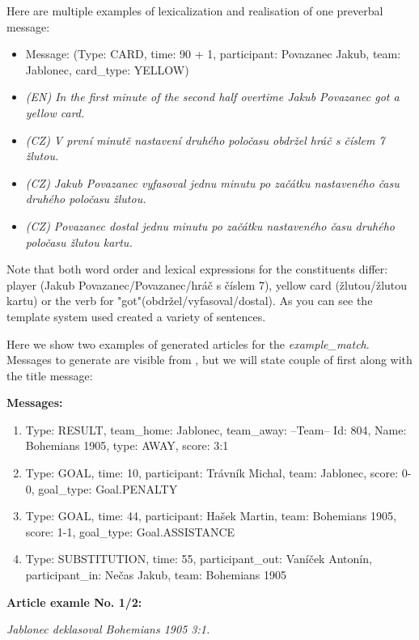 Here are multiple examples of lexicalization and realisation of one preverbal message:
\begin{itemize}
	\item Message: (Type: CARD, time: 90 + 1, participant: Povazanec Jakub, team: Jablonec, card\_type: YELLOW)
	\item \textit{(EN) In the first minute of the second half overtime Jakub Povazanec got a yellow card.}
	\item \textit{(CZ) V první minutě nastavení druhého poločasu obdržel hráč s číslem 7 žlutou.}
	\item \textit{(CZ) Jakub Povazanec vyfasoval jednu minutu po začátku nastaveného času druhého poločasu žlutou.}
	\item \textit{(CZ) Povazanec dostal jednu minutu po začátku nastaveného času druhého poločasu žlutou kartu.}
\end{itemize}
Note that both word order and lexical expressions for the constituents differ: player (Jakub Povazanec/Povazanec/hráč s číslem 7), yellow card (žlutou/žlutou kartu) or the verb for "got"(obdržel/vyfasoval/dostal). As you can see the template system used created a variety of sentences.

Here we show two examples of generated articles for the \textit{example\_match}. Messages to generate are visible from , but we will state couple of first along with the title message:

\noindent\makebox[\linewidth]{\rule{\textwidth}{0.4pt}}
\textbf{Messages:}
\begin{enumerate}
	\item Type: RESULT, team\_home: Jablonec, team\_away: --Team-- Id: 804, Name: Bohemians 1905, type: AWAY, score: 3:1
	\item Type: GOAL, time: 10, participant: Trávník Michal, team: Jablonec, score: 0-0, goal\_type: Goal.PENALTY
	\item Type: GOAL, time: 44, participant: Hašek Martin, team: Bohemians 1905, score: 1-1, goal\_type: Goal.ASSISTANCE
	\item Type: SUBSTITUTION, time: 55, participant\_out: Vaníček Antonín, participant\_in: Nečas Jakub, team: Bohemians 1905
\end{enumerate}

\noindent\makebox[\linewidth]{\rule{\textwidth}{0.4pt}}
\textbf{Article examle No. 1/2:}
\begin{center}
\textit{Jablonec deklasoval Bohemians 1905 3:1.  }
\end{center}


